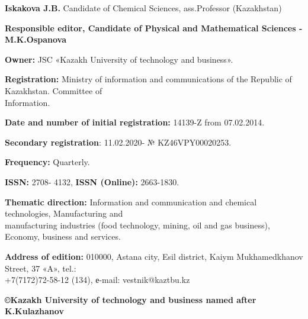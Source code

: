 {\textbf{Iskakova J.B.} Candidate of Chemical Sciences, ass.Professor (Kazakhstan)

\begin{center}
\textbf{Responsible editor, Candidate of Physical and Mathematical Sciences - M.K.Ospanova}
\end{center}

\textbf{Owner:} JSC «Kazakh University of technology and business».

\textbf{Registration:} Ministry of information and communications of the Republic of Kazakhstan. Committee of \\Information.

\textbf{Date and number of initial registration:} 14139-Z from 07.02.2014.

\textbf{Secondary registration}: 11.02.2020- № KZ46VPY00020253.

\textbf{Frequency:} Quarterly.

\textbf{ISSN:} 2708- 4132, \textbf{ISSN (Online):} 2663-1830.

\textbf{Thematic direction:} Information and communication and chemical
technologies, Manufacturing and \\manufacturing industries (food
technology, mining, oil and gas business), Economy, business and services.

\textbf{Address of edition:} 010000, Astana city, Esil district, Kaiym
Mukhamedkhanov Street, 37 «A», tel.: \\+7(7172)72-58-12 (134),
е-mail: vestnik@kaztbu.kz
\vfill
\begin{center}
\textbf{\normalsize ©Kazakh University of technology and business named after K.Kulazhanov}
\end{center}
}
\pagebreak
